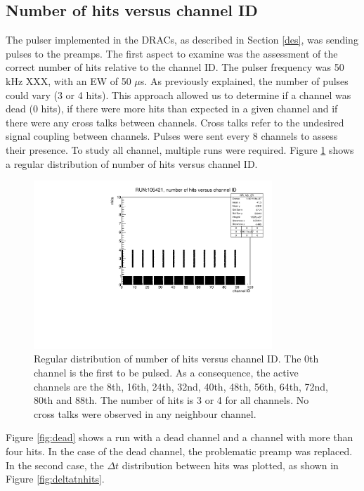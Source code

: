 \subsection{Number of hits versus channel ID}\label{nhitvschid}
The pulser implemented in the DRACs, as described in Section \ref{des}, was sending pulses to the preamps. 
The first aspect to examine was the assessment of the correct number of hits relative to the channel ID.
The pulser frequency was 50 kHz XXX, with an EW of 50 $\mu$s. As previously explained, 
the number of pulses could vary (3 or 4 hits). This approach allowed us to determine if a channel was dead (0 hits), 
if there were more hits than expected in a given channel and if there were any cross talks between channels. 
Cross talks refer to the undesired signal coupling between channels. 
Pulses were sent every 8 channels to assess their presence. To study all channel, multiple runs were required.
Figure \ref{fig:normalhits} shows a regular distribution of number of hits versus channel ID.
\begin{figure}[!h]
      \centering
      \includegraphics[width=0.8\textwidth]{figures/pdf/run105421_nh_vs_ch.pdf}
      \caption{Regular distribution of number of hits versus channel ID. The 0th channel is the first to be pulsed.
      As a consequence, the active channels are the 8th, 16th, 24th, 32nd, 40th, 48th, 56th, 64th, 72nd, 80th and 88th. The number of hits is 3 or 4 for all channels. 
      No cross talks were observed in any neighbour channel.}
     \label{fig:normalhits}
\end{figure}
Figure \ref{fig:dead} shows a run with a dead channel and a channel with more than four hits. 
In the case of the dead channel, the problematic preamp was replaced. In the second case, the 
$\Delta t$ distribution between hits was plotted, as shown in Figure \ref{fig:deltatnhits}.

